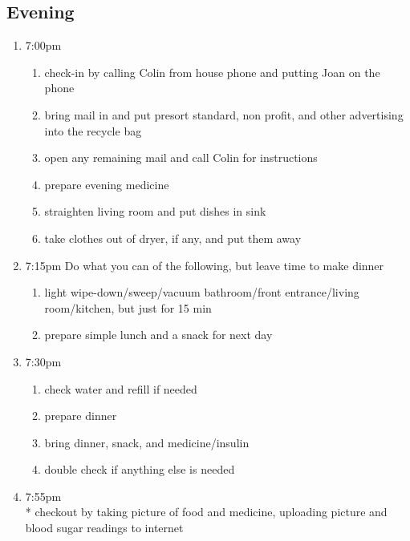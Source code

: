 \documentclass[12pt,letterpaper]{article}
\begin{document}
\begin{multicols}{2}
\subsection*{Evening}
\begin{enumerate}
	\item 7:00pm
		\begin{enumerate}
			\item check-in by calling Colin from house phone and putting Joan on the phone
			\item bring mail in and put presort standard, non profit, and other advertising into the recycle bag
			\item open any remaining mail and call Colin for instructions
			\item prepare evening medicine
			\item straighten living room and put dishes in sink
			\item take clothes out of dryer, if any, and put them away
		\end{enumerate}
	\item 7:15pm
		Do what you can of the following, but leave time to make dinner
		\begin{enumerate}
			\item light wipe-down/sweep/vacuum bathroom/front entrance/living room/kitchen, but just for 15 min
			\item prepare simple lunch and a snack for next day
		\end{enumerate}
	\item 7:30pm
		\begin{enumerate}
			\item check water and refill if needed
			\item prepare dinner
			\item bring dinner, snack, and medicine/insulin
			\item double check if anything else is needed
		\end{enumerate}
	\item 7:55pm \\*
		checkout by taking picture of food and medicine, uploading picture and blood sugar readings to internet
\end{enumerate}
\end{multicols}
\end{document}
